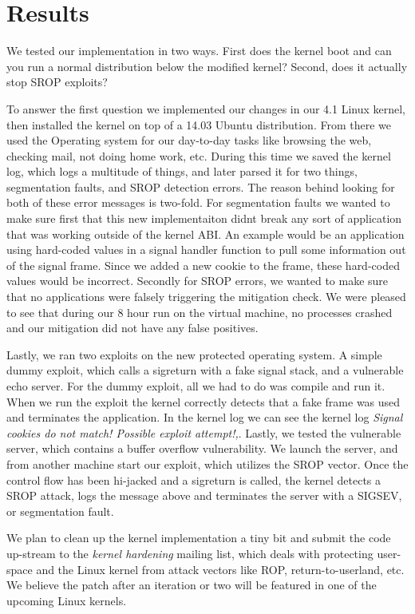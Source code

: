 \documentclass{sig-alternate-05-2015}
\begin{document}
\section{Results}
We tested our implementation in two ways. First does the kernel boot and can you run a normal distribution below the modified kernel? Second, does it actually stop SROP exploits?

To answer the first question we implemented our changes in our 4.1 Linux kernel, then installed the kernel on top of a 14.03 Ubuntu distribution. From there we used the Operating system for our day-to-day tasks like browsing the web, checking mail, not doing home work, etc. During this time we saved the kernel log, which logs a multitude of things, and later parsed it for two things, segmentation faults, and SROP detection errors. The reason behind looking for both of these error messages is two-fold. For segmentation faults we wanted to make sure first that this new implementaiton didnt break any sort of application that was working outside of the kernel ABI. An example would be an application using hard-coded values in a signal handler function to pull some information out of the signal frame. Since we added a new cookie to the frame, these hard-coded values would be incorrect. Secondly for SROP errors, we wanted to make sure that no applications were falsely triggering the mitigation check. We were pleased to see that during our 8 hour run on the virtual machine, no processes crashed and our mitigation did not have any false positives.

Lastly, we ran two exploits on the new protected operating system. A simple dummy exploit, which calls a sigreturn with a fake signal stack, and a vulnerable echo server. For the dummy exploit, all we had to do was compile and run it. When we run the exploit the kernel correctly detects that a fake frame was used and terminates the application. In the kernel log we can see the kernel log \textit{Signal cookies do not match! Possible exploit attempt!,}. Lastly, we tested the vulnerable server, which contains a buffer overflow vulnerability. We launch the server, and from another machine start our exploit, which utilizes the SROP vector. Once the control flow has been hi-jacked and a sigreturn is called, the kernel detects a SROP attack, logs the message above and terminates the server with a SIGSEV, or segmentation fault.

We plan to clean up the kernel implementation a tiny bit and submit the code up-stream to the \textit{kernel hardening} mailing list, which deals with protecting user-space and the Linux kernel from attack vectors like ROP, return-to-userland, etc. We believe the patch after an iteration or two will be featured in one of the upcoming Linux kernels.
\end{document}
